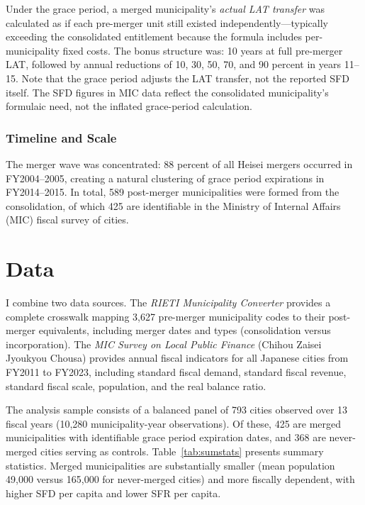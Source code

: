 \documentclass[12pt]{article}
\begin{document}
Under the grace period, a merged municipality's \emph{actual LAT transfer} was calculated as if each pre-merger unit still existed independently---typically exceeding the consolidated entitlement because the formula includes per-municipality fixed costs. The bonus structure was: 10 years at full pre-merger LAT, followed by annual reductions of 10, 30, 50, 70, and 90 percent in years 11--15. Note that the grace period adjusts the LAT transfer, not the reported SFD itself. The SFD figures in MIC data reflect the consolidated municipality's formulaic need, not the inflated grace-period calculation.

\subsubsection*{Timeline and Scale} The merger wave was concentrated: 88 percent of all Heisei mergers occurred in FY2004--2005, creating a natural clustering of grace period expirations in FY2014--2015. In total, 589 post-merger municipalities were formed from the consolidation, of which 425 are identifiable in the Ministry of Internal Affairs (MIC) fiscal survey of cities.

\section{Data}

I combine two data sources. The \textit{RIETI Municipality Converter} \citep{kondo2023} provides a complete crosswalk mapping 3,627 pre-merger municipality codes to their post-merger equivalents, including merger dates and types (consolidation versus incorporation). The \textit{MIC Survey on Local Public Finance} (Chihou Zaisei Jyoukyou Chousa) provides annual fiscal indicators for all Japanese cities from FY2011 to FY2023, including standard fiscal demand, standard fiscal revenue, standard fiscal scale, population, and the real balance ratio.

The analysis sample consists of a balanced panel of 793 cities observed over 13 fiscal years (10,280 municipality-year observations). Of these, 425 are merged municipalities with identifiable grace period expiration dates, and 368 are never-merged cities serving as controls. Table~\ref{tab:sumstats} presents summary statistics. Merged municipalities are substantially smaller (mean population 49,000 versus 165,000 for never-merged cities) and more fiscally dependent, with higher SFD per capita and lower SFR per capita.


\end{document}
